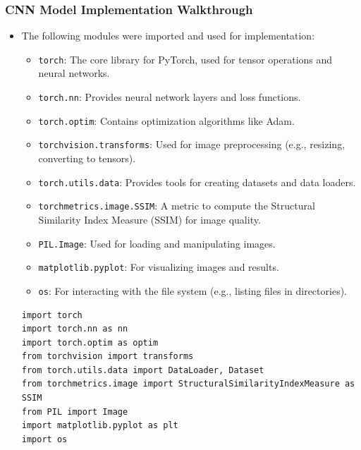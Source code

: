 \documentclass[conference]{IEEEtran}
\begin{document}
\subsubsection{CNN Model Implementation Walkthrough}
\begin{itemize}
    \item The following modules were imported and used for implementation:
    \begin{itemize}
        \item \texttt{torch}: The core library for PyTorch, used for tensor operations and neural networks.
        \item \texttt{torch.nn}: Provides neural network layers and loss functions.
        \item \texttt{torch.optim}: Contains optimization algorithms like Adam.
        \item \texttt{torchvision.transforms}: Used for image preprocessing (e.g., resizing, converting to tensors).
        \item \texttt{torch.utils.data}: Provides tools for creating datasets and data loaders.
        \item \texttt{torchmetrics.image.SSIM}: A metric to compute the Structural Similarity Index Measure (SSIM) for image quality.
        \item \texttt{PIL.Image}: Used for loading and manipulating images.
        \item \texttt{matplotlib.pyplot}: For visualizing images and results.
        \item \texttt{os}: For interacting with the file system (e.g., listing files in directories).
    \end{itemize}

    \begin{lstlisting}
import torch
import torch.nn as nn
import torch.optim as optim
from torchvision import transforms
from torch.utils.data import DataLoader, Dataset
from torchmetrics.image import StructuralSimilarityIndexMeasure as SSIM
from PIL import Image
import matplotlib.pyplot as plt
import os
    \end{lstlisting}


\end{itemize}
\end{document}
